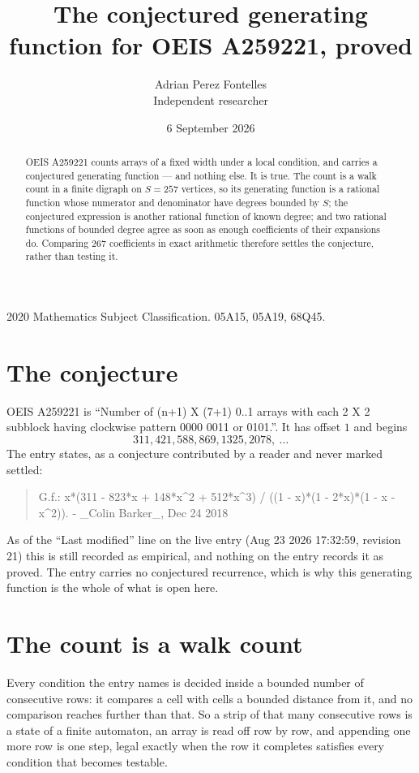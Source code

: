 \documentclass[11pt,a4paper]{article}
\title{The conjectured generating function for OEIS A259221, proved}
\author{Adrian Perez Fontelles\\ \small Independent researcher}
\date{6 September 2026}
\theoremstyle{plain}
\theoremstyle{definition}
\begin{document}
\maketitle

\begin{abstract}
OEIS A259221 counts arrays of a fixed width under a local condition, and carries a conjectured
generating function --- and nothing else. It is true. The count is a walk count in a finite
digraph on $S=257$ vertices, so its generating function is a rational function whose numerator
and denominator have degrees bounded by $S$; the conjectured expression is another rational
function of known degree; and two rational functions of bounded degree agree as soon as enough
coefficients of their expansions do. Comparing $267$ coefficients in exact arithmetic
therefore settles the conjecture, rather than testing it.
\end{abstract}

\noindent\small 2020 Mathematics Subject Classification. 05A15, 05A19, 68Q45.\normalsize

\section{The conjecture}

OEIS A259221 is ``Number of (n+1) X (7+1) 0..1 arrays with each 2 X 2 subblock having clockwise pattern 0000 0011 or 0101.''. It has offset $1$ and begins
\[
311, 421, 588, 869, 1325, 2078,\ \dots
\]
The entry states, as a conjecture contributed by a reader and never marked settled:
\begin{quote}
G.f.: x*(311 - 823*x + 148*x\^{}2 + 512*x\^{}3) / ((1 - x)*(1 - 2*x)*(1 - x - x\^{}2)). - \_Colin Barker\_, Dec 24 2018
\end{quote}
As of the ``Last modified'' line on the live entry (Aug 23 2026 17:32:59, revision 21) this is still
recorded as empirical, and nothing on the entry records it as proved. The entry carries no
conjectured recurrence, which is why this generating function is the whole of what is open
here.

\section{The count is a walk count}

Every condition the entry names is decided inside a bounded number of consecutive rows: it
compares a cell with cells a bounded distance from it, and no comparison reaches further than
that. So a strip of that many consecutive rows is a state of a finite automaton, an array is
read off row by row, and appending one more row is one step, legal exactly when the row it
completes satisfies every condition that becomes testable.
\end{document}

